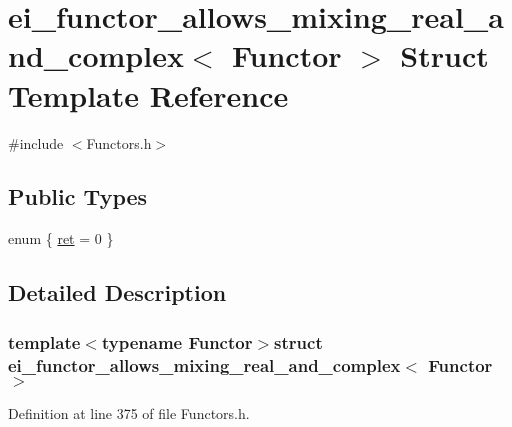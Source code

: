 \hypertarget{structei__functor__allows__mixing__real__and__complex}{\section{ei\-\_\-functor\-\_\-allows\-\_\-mixing\-\_\-real\-\_\-and\-\_\-complex$<$ Functor $>$ Struct Template Reference}
\label{structei__functor__allows__mixing__real__and__complex}
}


{\ttfamily \#include $<$Functors.\-h$>$}

\subsection*{Public Types}
\begin{DoxyCompactItemize}
\item 
enum \{ \hyperlink{structei__functor__allows__mixing__real__and__complex_afea9dae1426a2fd339643567c3a63dd5af9a2d2b7d885be46bd1f5966462813e3}{ret} = 0
 \}
\end{DoxyCompactItemize}


\subsection{Detailed Description}
\subsubsection*{template$<$typename Functor$>$struct ei\-\_\-functor\-\_\-allows\-\_\-mixing\-\_\-real\-\_\-and\-\_\-complex$<$ Functor $>$}



Definition at line 375 of file Functors.\-h.



